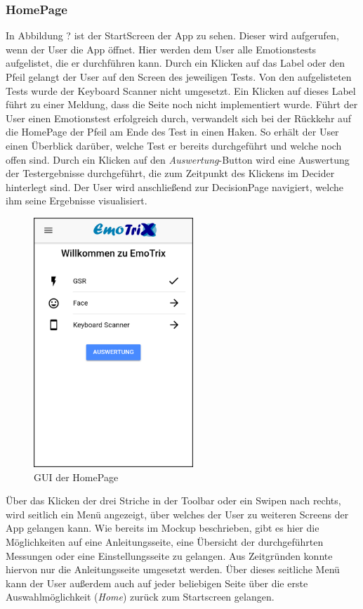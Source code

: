 \subsubsection{HomePage}
In Abbildung ? ist der StartScreen der App zu sehen. Dieser wird aufgerufen, wenn der User die App öffnet. Hier werden dem User alle Emotionstests aufgelistet, die er durchführen kann. Durch ein Klicken auf das Label oder den Pfeil gelangt der User auf den Screen des jeweiligen Tests. Von den aufgelisteten Tests wurde der Keyboard Scanner nicht umgesetzt. Ein Klicken auf dieses Label führt zu einer Meldung, dass die Seite noch nicht implementiert wurde. \newline
Führt der User einen Emotionstest erfolgreich durch, verwandelt sich bei der Rückkehr auf die HomePage der Pfeil am Ende des Test in einen Haken. So erhält der User einen Überblick darüber, welche Test er bereits durchgeführt und welche noch offen sind. \newline
Durch ein Klicken auf den \textit{Auswertung}-Button wird eine Auswertung der Testergebnisse durchgeführt, die zum Zeitpunkt des Klickens im Decider hinterlegt sind. Der User wird anschließend zur DecisionPage navigiert, welche ihm seine Ergebnisse visualisiert. \newline
\begin{figure}[h]
	\centering
	\includegraphics[width=6cm]{Bilder/homepage.png}
	\caption[GUI der HomePage]{GUI der HomePage}
\end{figure}%
\newline
Über das Klicken der drei Striche in der Toolbar oder ein Swipen nach rechts, wird seitlich ein Menü angezeigt, über welches der User zu weiteren Screens der App gelangen kann. Wie bereits im Mockup beschrieben, gibt es hier die Möglichkeiten auf eine Anleitungsseite, eine Übersicht der durchgeführten Messungen oder eine Einstellungsseite zu gelangen. Aus Zeitgründen konnte hiervon nur die Anleitungsseite umgesetzt werden. Über dieses seitliche Menü kann der User außerdem auch auf jeder beliebigen Seite über die erste Auswahlmöglichkeit (\textit{Home}) zurück zum Startscreen gelangen.
